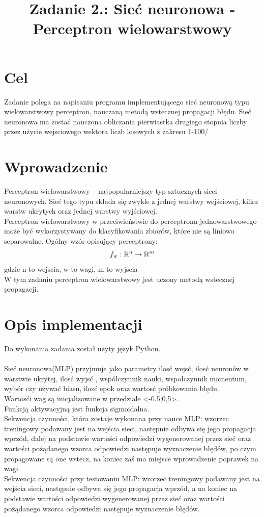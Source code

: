 \documentclass{classrep}
\author{%
  \studentinfo[210139@edu.p.lodz.pl]{Krzysztof Barden}{210139}
}
\title{Zadanie 2.: Sieć neuronowa - Perceptron wielowarstwowy}
\newcommand{\R}{\mathbb{R}}
\begin{document}
\maketitle
\thispagestyle{fancyplain}

\section{Cel}
{
Zadanie polega na napisaniu programu implementującego sieć neuronową typu wielowarstwowy perceptron, nauczaną metodą wstecznej propagacji błędu.
Sieć neuronowa ma zostać nauczona obliczania pierwiastka drugiego stopnia liczby przez użycie wejsciowego wektora liczb losowych z zakresu 1-100/

}

\section{Wprowadzenie}
{
Perceptron wielowarstwowy – najpopularniejszy typ sztucznych 
sieci neuronowych. Sieć tego typu składa się zwykle z jednej warstwy
 wejściowej, kilku warstw ukrytych oraz jednej warstwy wyjściowej.\\
Perceptron wielowarstwowy w przeciwieństwie do perceptronu jednowarstwowego 
może być wykorzystywany do klasyfikowania zbiorów, które nie są liniowo separowalne.
Ogólny wzór opisujący perceptrony:
\begin{equation}
f_w : \R ^n \rightarrow \R ^m\\
\end{equation}
gdzie n to wejscia, w to wagi, m to wyjscia\\ 
W tym zadaniu perceptron wielowarstwowy jest uczony metodą wstecznej propagacji.}

\section{Opis implementacji}
{Do wykonania zadania został użyty język Python.\\\\
Sieć neuronowa(MLP) przyjmuje jako parametry ilosć wejsć, ilosć neuronów w warstwie ukrytej, ilosć wyjsć
, współczynnik nauki, wspołczynnik momentum, wybór czy używać biasu, ilosć epok oraz wartosć próbkowania błędu.\\
Wartosći wag są inicjalizowane w przedziale <-0.5;0,5>.\\
Funkcją aktywacyjną jest funkcja sigmoidalna.\\
Sekwencja czynności, która zostaje wykonana przy nauce MLP: wzorzec treningowy podawany jest na wejścia sieci, następnie odbywa się jego propagacja wprzód, dalej na podstawie wartości odpowiedzi wygenerowanej przez sieć oraz wartości pożądanego wzorca odpowiedzi następuje wyznaczenie błędów, po czym propagowane są one wstecz, na koniec zaś ma miejsce wprowadzenie poprawek na wagi.\\
Sekwencja czynności przy testowaniu MLP: wzorzec treningowy podawany jest na wejścia sieci, następnie odbywa się jego propagacja wprzód, a na koniec na podstawie wartości odpowiedzi wygenerowanej przez sieć oraz wartości pożądanego wzorca odpowiedzi następuje wyznaczenie błędów.
}
\end{document}
